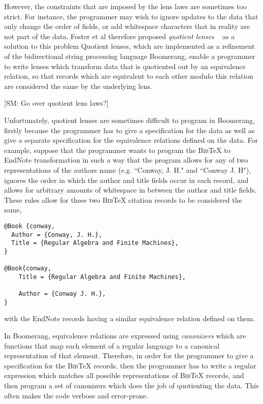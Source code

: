 \documentclass{svproc}
\newcommand{\FINISH}[3]{\ifdraft\textcolor{#1}{[#2: #3]}\fi}
\newcommand{\sam}[1]{\FINISH{dkpurple}{SM}{#1}}
\newcommand{\bibtex}{\textsc{Bib}\TeX{}}
\begin{document}
However, the constraints that are imposed by the lens laws are sometimes too
strict. For instance, the programmer may wish to ignore updates to the data
that only change the order of fields, or add whitespace characters that in
reality are not part of the data. Foster et al therefore proposed
\textit{quotient lenses} ~\cite{quotient} as a solution to this problem
Quotient lenses, which are implemented as a refinement of the bidirectional
string processing language Boomerang, enable a programmer to write lenses which
transform data that is quotiented out by an equivalence relation, so that
records which are equivalent to each other modulo this relation are considered
the same by the underlying lens.

\sam{Go over quotient lens laws?}

Unfortunately, quotient lenses are sometimes difficult to program in Boomerang,
firstly because the programmer has to give a specification for the data as well
as give a separate specification for the equivalence relations defined on the
data. For example, suppose that the programmer wants to program the \bibtex{} to
EndNote transformation in such a way that the program allows for any of two
representations of the authors name (e.g. ``Conway, J. H." and ``Conway J. H"),
ignores the order in which the author and title fields occur in each record,
and allows for arbitrary amounts of whitespace in between the author and title
fields. These rules allow for these two \bibtex{} citation records to be
considered the same,

\begin{verbatim}
@Book {conway,
  Author = {Conway, J. H.},
  Title = {Regular Algebra and Finite Machines},
}

@Book{conway,
    Title = {Regular Algebra and Finite Machines},
        
    Author = {Conway J. H.},
}
\end{verbatim}

with the EndNote records having a similar equivalence relation defined on them.

In Boomerang, equivalence relations are expressed using {\em canonizers}
which are functions that map each element of a regular language to a
canonical representation of that element. Therefore, in order for the programmer
to give a specification for the \bibtex{} records, then the programmer
has to write a regular expression which matches all possible representations of
\bibtex{} records, and then program a set of canonizers which does the job of
quotienting the data. This often makes the code verbose and error-prone.
\end{document}
